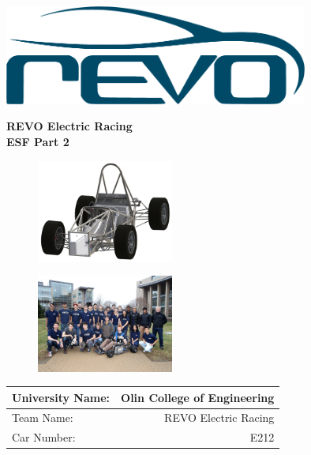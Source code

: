 \documentclass{article}
\begin{document}
\begin{titlepage}
    \centering
    \vfill

    \includegraphics[width=10cm]{revo.png}

    {\bfseries\Large
        REVO Electric Racing\\
        \vskip2cm
        ESF Part 2\\
    }
    \vfill
    \begin{figure}[H]
        \includegraphics[width=0.4\textwidth]{carRender.png}
        \centering
    \end{figure}

    \vfill
    \begin{figure}[H]
        \includegraphics[width=0.4\textwidth]{teamphoto.jpg}
        \centering
    \end{figure}
    \vfill

    \begin{table}[H]
        \centering
        \label{teaminfo}
        \begin{tabular}{lr}
        University Name: & Olin College of Engineering \\ \hline
        Team Name: & REVO Electric Racing \\ \hline
        Car Number: & E212 \\ \hline
        \end{tabular}
    \end{table}


\end{titlepage}
\end{document}

